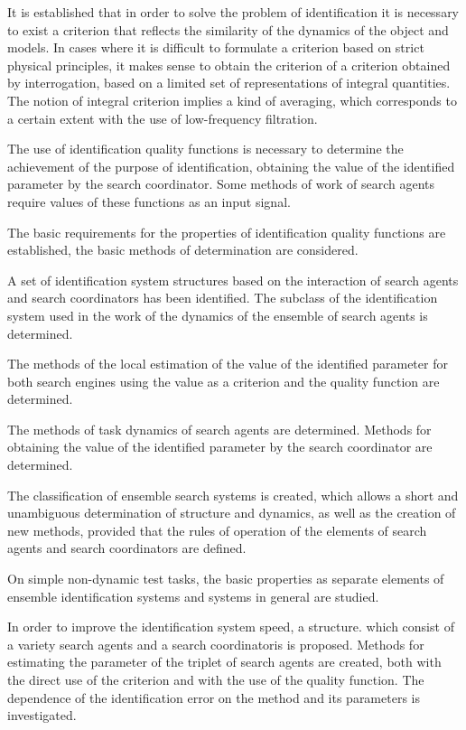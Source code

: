 It is established that in order to solve the problem of identification it is
necessary to exist a criterion that reflects the similarity of the dynamics of
the object and models. In cases where it is difficult to formulate a criterion
based on strict physical principles, it makes sense to obtain the criterion of
a criterion obtained by interrogation, based on a limited set of
representations of integral quantities.
The notion of integral criterion implies a kind of averaging, which corresponds
to a certain extent with the use of low-frequency filtration.

The use of identification quality functions is necessary to determine the
achievement of the purpose of identification, obtaining the value of the
identified parameter by the search coordinator. Some methods of work of search
agents require values of these functions as an input signal.

The basic requirements for the properties of identification quality functions
are established, the basic methods of determination are considered.

A set of identification system structures based on the interaction of search
agents and search coordinators has been identified. The subclass of the
identification system used in the work of the dynamics of the ensemble of
search agents is determined.

The methods of the local estimation of the value of the identified parameter
for both search engines using the value as a criterion and the quality function
are determined.

The methods of task dynamics of search agents are determined. Methods for
obtaining the value of the identified parameter by the search coordinator are
determined.

The classification of ensemble search systems is created, which allows a short
and unambiguous determination of structure and dynamics, as well as the
creation of new methods, provided that the rules of operation of the elements
of search agents and search coordinators are defined.

On simple non-dynamic test tasks, the basic properties as separate elements of
ensemble identification systems and systems in general are studied.


In order to improve the identification system speed,
a structure. which consist of a variety search agents and a search coordinatoris is proposed.
Methods for estimating the parameter of the triplet of search agents are created, both with
the direct use of the criterion and with the use of the quality function. The
dependence of the identification error on the method and its parameters is
investigated.

